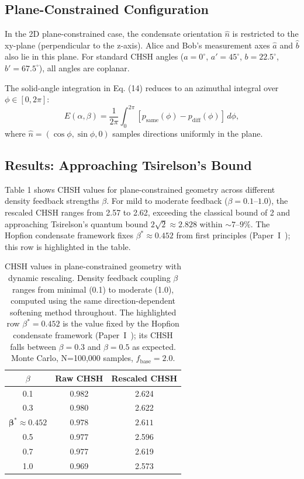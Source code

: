 \subsection*{Plane-Constrained Configuration}

In the 2D plane-constrained case, the condensate orientation $\hat{n}$ is restricted to the xy-plane (perpendicular to the z-axis). Alice and Bob's measurement axes $\hat{a}$ and $\hat{b}$ also lie in this plane. For standard CHSH angles ($a=0^\circ$, $a'=45^\circ$, $b=22.5^\circ$, $b'=67.5^\circ$), all angles are coplanar.

The solid-angle integration in Eq. (14) reduces to an azimuthal integral over $\phi \in [0, 2\pi]$:
\begin{equation}
E(\alpha, \beta) = \frac{1}{2\pi} \int_0^{2\pi} [p_{\mathrm{same}}(\phi) - p_{\mathrm{diff}}(\phi)] \, d\phi,
\label{P8:eq:E_planar}
\end{equation}
where $\hat{n} = (\cos\phi, \sin\phi, 0)$ samples directions uniformly in the plane.

\subsection*{Results: Approaching Tsirelson's Bound}

Table 1 shows CHSH values for plane-constrained geometry across different density feedback strengths $\beta$. For mild to moderate feedback ($\beta = 0.1$--$1.0$), the rescaled CHSH ranges from 2.57 to 2.62, exceeding the classical bound of 2 and approaching Tsirelson's quantum bound $2\sqrt{2} \approx 2.828$ within $\sim 7$--$9\%$. The Hopfion condensate framework fixes $\beta^* \approx 0.452$ from first principles (Paper~I~\cite{Paper1}); this row is highlighted in the table.

\begin{table}[h]
\centering
\caption{CHSH values in plane-constrained geometry with dynamic rescaling.
Density feedback coupling $\beta$ ranges from minimal (0.1) to moderate (1.0),
computed using the same direction-dependent softening method throughout.
The highlighted row $\beta^* = 0.452$ is the value fixed by the Hopfion
condensate framework (Paper~I~\cite{Paper1}); its CHSH falls between $\beta=0.3$ and
$\beta=0.5$ as expected. Monte Carlo, N=100,000 samples, $f_{\mathrm{base}}=2.0$.}
\label{P8:tab:planar_chsh}
\begin{tabular}{c|c|c}
\hline
$\beta$ & Raw CHSH & Rescaled CHSH \\
\hline
0.1 & 0.982 & 2.624 \\
0.3 & 0.980 & 2.622 \\
$\boldsymbol{\beta^* \approx 0.452}$ & $\mathbf{0.978}$ & $\mathbf{2.611}$ \\
0.5 & 0.977 & 2.596 \\
0.7 & 0.977 & 2.619 \\
1.0 & 0.969 & 2.573 \\
\hline
\end{tabular}
\end{table}

